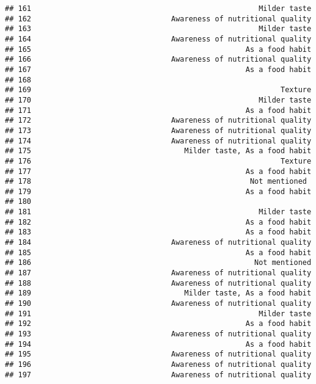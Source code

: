 \documentclass[
]{article}
\begin{document}
\begin{verbatim}
## 161                                                    Milder taste
## 162                                Awareness of nutritional quality
## 163                                                    Milder taste
## 164                                Awareness of nutritional quality
## 165                                                 As a food habit
## 166                                Awareness of nutritional quality
## 167                                                 As a food habit
## 168                                                                
## 169                                                         Texture
## 170                                                    Milder taste
## 171                                                 As a food habit
## 172                                Awareness of nutritional quality
## 173                                Awareness of nutritional quality
## 174                                Awareness of nutritional quality
## 175                                   Milder taste, As a food habit
## 176                                                         Texture
## 177                                                 As a food habit
## 178                                                  Not mentioned 
## 179                                                 As a food habit
## 180                                                                
## 181                                                    Milder taste
## 182                                                 As a food habit
## 183                                                 As a food habit
## 184                                Awareness of nutritional quality
## 185                                                 As a food habit
## 186                                                   Not mentioned
## 187                                Awareness of nutritional quality
## 188                                Awareness of nutritional quality
## 189                                   Milder taste, As a food habit
## 190                                Awareness of nutritional quality
## 191                                                    Milder taste
## 192                                                 As a food habit
## 193                                Awareness of nutritional quality
## 194                                                 As a food habit
## 195                                Awareness of nutritional quality
## 196                                Awareness of nutritional quality
## 197                                Awareness of nutritional quality

\end{verbatim}
\end{document}
